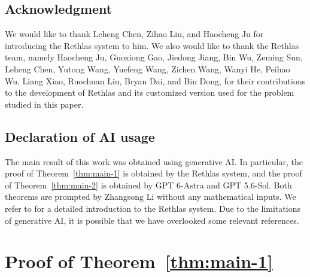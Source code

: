 \documentclass[11pt,reqno]{amsart}
\begin{document}
\subsection*{Acknowledgment}

We would like to thank Leheng Chen, Zihao Liu, and Haocheng Ju for introducing the Rethlas system to him. We also would like to thank the Rethlas team, namely Haocheng Ju, Guoxiong Gao, Jiedong Jiang, Bin Wu, Zeming Sun, Leheng Chen, Yutong Wang, Yuefeng Wang, Zichen Wang, Wanyi He, Peihao Wu, Liang Xiao, Ruochuan Liu, Bryan Dai, and Bin Dong, for their contributions to the development of Rethlas and its customized version used for the problem studied in this paper. 

\subsection*{Declaration of AI usage}

The main result of this work was obtained using generative AI. In particular, the proof of Theorem~\ref{thm:main-1} is obtained by the Rethlas system, and the proof of Theorem~\ref{thm:main-2} is obtained by GPT 6-Astra and GPT 5.6-Sol. Both theorems are prompted by Zhangsong Li without any mathematical inputs. We refer to \cite{ju2026automated} for a detailed introduction to the Rethlas system. Due to the limitations of generative AI, it is possible that we have overlooked some relevant references.




\section{Proof of Theorem~\ref{thm:main-1}}{\label{sec:proof-main-thm-1}}
\end{document}
